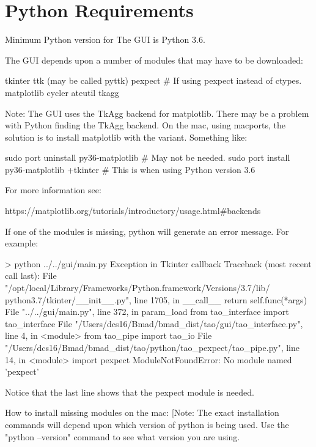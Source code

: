 \section{Python Requirements}

Minimum Python version for The GUI is Python 3.6.

The GUI depends upon a number of modules that may have to be downloaded:
\begin{example}
  tkinter
  ttk (may be called pyttk)
  pexpect         # If using pexpect instead of ctypes.
  matplotlib
  cycler
  ateutil
  tkagg
\end{example}
Note: The GUI uses the TkAgg backend for matplotlib. There may be a problem with Python finding the
TkAgg backend. On the mac, using macports, the solution is to install matplotlib with the
 variant. Something like:
\begin{example}
  sudo port uninstall py36-matplotlib           # May not be needed.
  sudo port install  py36-matplotlib +tkinter   # This is when using Python version 3.6
\end{example}
For more information see:
\begin{example}
  https://matplotlib.org/tutorials/introductory/usage.html#backends
\end{example}

If one of the modules is missing, python will generate an error message. For example:
\begin{example}
> python ../../gui/main.py
Exception in Tkinter callback
Traceback (most recent call last):
  File "/opt/local/Library/Frameworks/Python.framework/Versions/3.7/lib/
                            python3.7/tkinter/__init__.py", line 1705, in __call__
    return self.func(*args)
  File "../../gui/main.py", line 372, in param_load
    from tao_interface import tao_interface
  File "/Users/dcs16/Bmad/bmad_dist/tao/gui/tao_interface.py", line 4, in <module>
    from tao_pipe import tao_io
  File "/Users/dcs16/Bmad/bmad_dist/tao/python/tao_pexpect/tao_pipe.py", line 14, in <module>
    import pexpect
ModuleNotFoundError: No module named 'pexpect'
\end{example}
Notice that the last line shows that the pexpect module is needed.

How to install missing modules on the mac: [Note: The exact installation commands will depend upon
which version of python is being used. Use the "python --version" command to see what version you
are using.

